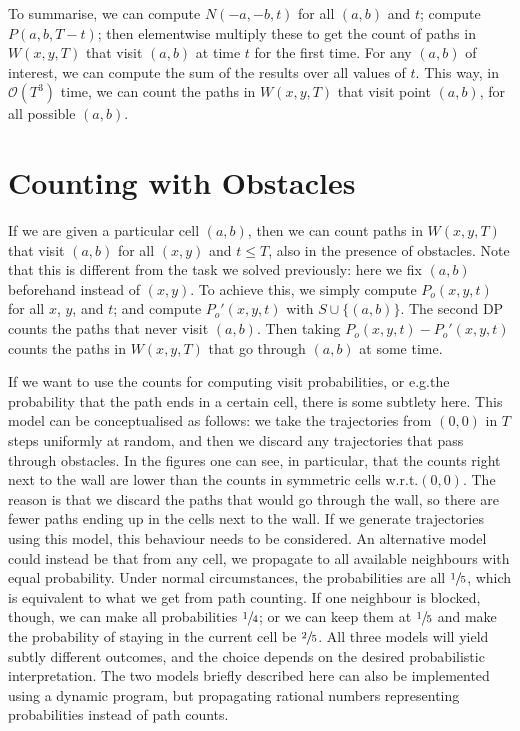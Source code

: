 \documentclass[11pt,a4paper,twoside,british]{article}
\begin{document}
To summarise, we can compute $N(-a, -b, t)$ for all $(a, b)$ and $t$; compute
$P(a, b, T - t)$; then elementwise multiply these to get the count of paths in
$W(x, y, T)$ that visit $(a, b)$ at time $t$ for the first time.
For any $(a, b)$ of interest, we can compute the sum of the results over all
values of $t$.
This way, in $\mathcal{O}(T^3)$ time, we can count the paths in $W(x, y, T)$
that visit point $(a, b)$, for all possible $(a, b)$.

\section{Counting with Obstacles}
If we are given a particular cell $(a, b)$, then we can count paths in
$W(x, y, T)$ that visit $(a, b)$ for all $(x, y)$ and $t \leq T$, also in the
presence of obstacles.
Note that this is different from the task we solved previously: here we fix
$(a, b)$ beforehand instead of $(x, y)$.
To achieve this, we simply compute $P_o(x, y, t)$ for all $x$, $y$, and $t$;
and compute $P_o'(x, y, t)$ with $S \cup \{(a, b)\}$.
The second DP counts the paths that never visit $(a, b)$.
Then taking $P_o(x, y, t) - P_o'(x, y, t)$ counts the paths in $W(x, y, T)$
that go through $(a, b)$ at some time.

If we want to use the counts for computing visit probabilities, or e.g.\@ the
probability that the path ends in a certain cell, there is some subtlety here.
This model can be conceptualised as follows: we take the trajectories from
$(0, 0)$ in $T$ steps uniformly at random, and then we discard any trajectories
that pass through obstacles.
In the figures one can see, in particular, that the counts right next to the
wall are lower than the counts in symmetric cells w.r.t.\@ $(0, 0)$.
The reason is that we discard the paths that would go through the wall, so there
are fewer paths ending up in the cells next to the wall.
If we generate trajectories using this model, this behaviour needs to be
considered.
An alternative model could instead be that from any cell, we propagate to all
available neighbours with equal probability.
Under normal circumstances, the probabilities are all $\sfrac{1}{5}$, which is
equivalent to what we get from path counting.
If one neighbour is blocked, though, we can make all probabilities
$\sfrac{1}{4}$; or we can keep them at $\sfrac{1}{5}$ and make the probability
of staying in the current cell be $\sfrac{2}{5}$.
All three models will yield subtly different outcomes, and the choice depends on
the desired probabilistic interpretation.
The two models briefly described here can also be implemented using a dynamic
program, but propagating rational numbers representing probabilities instead of
path counts.
\end{document}
